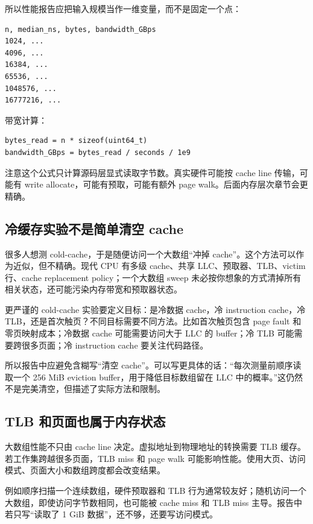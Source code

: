 所以性能报告应把输入规模当作一维变量，而不是固定一个点：

\begin{lstlisting}
n, median_ns, bytes, bandwidth_GBps
1024, ...
4096, ...
16384, ...
65536, ...
1048576, ...
16777216, ...
\end{lstlisting}

带宽计算：

\begin{lstlisting}
bytes_read = n * sizeof(uint64_t)
bandwidth_GBps = bytes_read / seconds / 1e9
\end{lstlisting}

注意这个公式只计算源码层显式读取字节数。真实硬件可能按 cache line 传输，可能有 write allocate，可能有预取，可能有额外 page walk。后面内存层次章节会更精确。

\subsection{冷缓存实验不是简单清空 cache}

很多人想测 cold-cache，于是随便访问一个大数组“冲掉 cache”。这个方法可以作为近似，但不精确。现代 CPU 有多级 cache、共享 LLC、预取器、TLB、victim 行、cache replacement policy；一个大数组 sweep 未必按你想象的方式清掉所有相关状态，还可能污染内存带宽和预取器状态。

更严谨的 cold-cache 实验要定义目标：是冷数据 cache，冷 instruction cache，冷 TLB，还是首次触页？不同目标需要不同方法。比如首次触页包含 page fault 和零页映射成本；冷数据 cache 可能需要访问大于 LLC 的 buffer；冷 TLB 可能需要跨很多页面；冷 instruction cache 要关注代码路径。

所以报告中应避免含糊写“清空 cache”。可以写更具体的话：“每次测量前顺序读取一个 256 MiB eviction buffer，用于降低目标数组留在 LLC 中的概率。”这仍然不是完美清空，但描述了实际方法和限制。

\subsection{TLB 和页面也属于内存状态}

大数组性能不只由 cache line 决定。虚拟地址到物理地址的转换需要 TLB 缓存。若工作集跨越很多页面，TLB miss 和 page walk 可能影响性能。使用大页、访问模式、页面大小和数组跨度都会改变结果。

例如顺序扫描一个连续数组，硬件预取器和 TLB 行为通常较友好；随机访问一个大数组，即使访问字节数相同，也可能被 cache miss 和 TLB miss 主导。报告中若只写“读取了 1 GiB 数据”，还不够，还要写访问模式。

